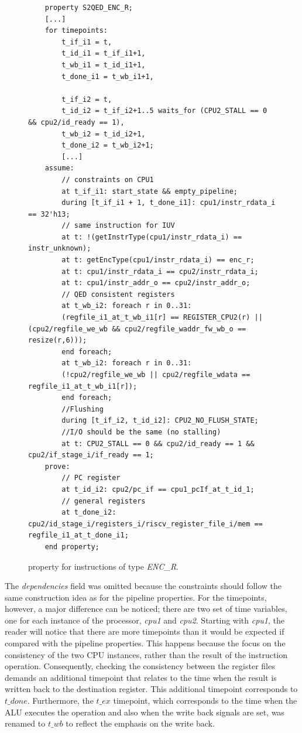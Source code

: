 \begin{figure}[htb!]
    \begin{lstlisting}
    property S2QED_ENC_R;
    [...]
    for timepoints:
        t_if_i1 = t,
        t_id_i1 = t_if_i1+1,
        t_wb_i1 = t_id_i1+1,
        t_done_i1 = t_wb_i1+1,
        
        t_if_i2 = t,
        t_id_i2 = t_if_i2+1..5 waits_for (CPU2_STALL == 0 && cpu2/id_ready == 1),
        t_wb_i2 = t_id_i2+1,
        t_done_i2 = t_wb_i2+1;
        [...]
    assume:
        // constraints on CPU1
        at t_if_i1: start_state && empty_pipeline;
        during [t_if_i1 + 1, t_done_i1]: cpu1/instr_rdata_i == 32'h13;
        // same instruction for IUV
        at t: !(getInstrType(cpu1/instr_rdata_i) == instr_unknown); 
        at t: getEncType(cpu1/instr_rdata_i) == enc_r;
        at t: cpu1/instr_rdata_i == cpu2/instr_rdata_i;
        at t: cpu1/instr_addr_o == cpu2/instr_addr_o;
        // QED consistent registers
        at t_wb_i2: foreach r in 0..31: 
        (regfile_i1_at_t_wb_i1[r] == REGISTER_CPU2(r) || (cpu2/regfile_we_wb && cpu2/regfile_waddr_fw_wb_o == resize(r,6))); 
        end foreach;
        at t_wb_i2: foreach r in 0..31: 
        (!cpu2/regfile_we_wb || cpu2/regfile_wdata == regfile_i1_at_t_wb_i1[r]); 
        end foreach;
        //Flushing
        during [t_if_i2, t_id_i2]: CPU2_NO_FLUSH_STATE;
        //I/O should be the same (no stalling)
        at t: CPU2_STALL == 0 && cpu2/id_ready == 1 && cpu2/if_stage_i/if_ready == 1;
    prove:
        // PC register
        at t_id_i2: cpu2/pc_if == cpu1_pcIf_at_t_id_1;
        // general registers
        at t_done_i2: cpu2/id_stage_i/registers_i/riscv_register_file_i/mem == regfile_i1_at_t_done_i1;
    end property;\end{lstlisting}
    \caption{\SSQED{} property for instructions of type \textit{ENC\_R}.}
    \label{fig:ri5cy-enc-r-s2qed-ppt}
\end{figure}

The \textit{dependencies} field was omitted because the constraints should follow the same construction idea as for the pipeline properties. For the timepoints, however, a major difference can be noticed; there are two set of time variables, one for each instance of the processor, \textit{cpu1} and \textit{cpu2}. Starting with \textit{cpu1}, the reader will notice that there are more timepoints than it would be expected if compared with the pipeline properties. This happens because the \SSQED{} focus on the consistency of the two CPU instances, rather than the result of the instruction operation. Consequently, checking the consistency between the register files demands an additional timepoint that relates to the time when the result is written back to the destination register. This additional timepoint corresponds to $t\_done$. Furthermore, the $t\_ex$ timepoint, which corresponds to the time when the ALU executes the operation and also when the write back signals are set, was renamed to $t\_wb$ to reflect the emphasis on the write back.


